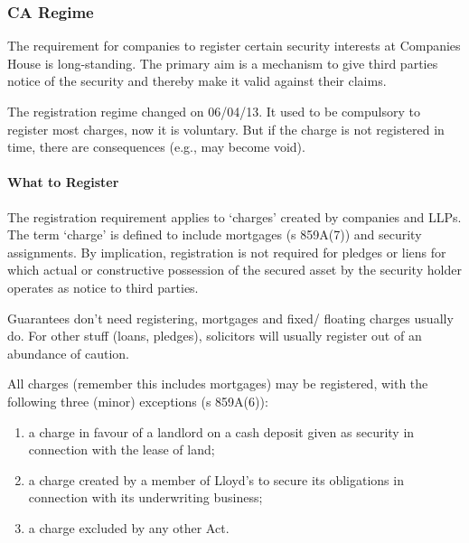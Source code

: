 \documentclass[
]{article}
\providecommand{\tightlist}{%
  \setlength{\itemsep}{0pt}\setlength{\parskip}{0pt}}
\begin{document}
\hypertarget{ca-regime}{%
\subsubsection{CA Regime}\label{ca-regime}}

The requirement for companies to register certain security interests at
Companies House is long-standing. The primary aim is a mechanism to give
third parties notice of the security and thereby make it valid against
their claims.

The registration regime changed on 06/04/13. It used to be compulsory to
register most charges, now it is voluntary. But if the charge is not
registered in time, there are consequences (e.g., may become void).

\hypertarget{what-to-register}{%
\paragraph{What to Register}\label{what-to-register}}

The registration requirement applies to `charges' created by companies
and LLPs. The term `charge' is defined to include mortgages (s 859A(7))
and security assignments. By implication, registration is not required
for pledges or liens for which actual or constructive possession of the
secured asset by the security holder operates as notice to third
parties.

Guarantees don't need registering, mortgages and fixed/ floating charges
usually do. For other stuff (loans, pledges), solicitors will usually
register out of an abundance of caution.

All charges (remember this includes mortgages) may be registered, with
the following three (minor) exceptions (s 859A(6)):

\begin{enumerate}
\tightlist
\item
  a charge in favour of a landlord on a cash deposit given as security
  in connection with the lease of land;
\item
  a charge created by a member of Lloyd's to secure its obligations in
  connection with its underwriting business;
\item
  a charge excluded by any other Act.
\end{enumerate}
\end{document}
